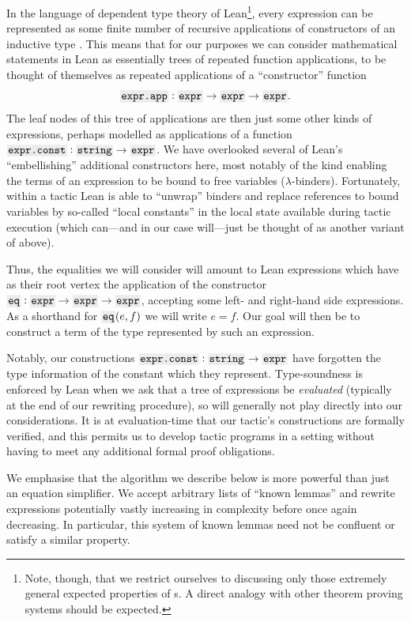 \documentclass[12pt]{easychair}
\begin{document}
In the language of dependent type theory of Lean\footnote{Note, though, that we restrict ourselves to discussing only those extremely general expected properties of \expr{}s. A direct analogy with other theorem proving systems should be expected.}, every expression can be represented as some finite number of recursive applications of constructors of an inductive type \expr{}. This means that for our purposes we can consider mathematical statements in Lean as essentially trees of repeated function applications, to be thought of themselves as repeated applications of a ``constructor'' function
\begin{equation*}
  \xx{expr.app} : \expr{} \to \expr{} \to \expr{}.
\end{equation*}
The leaf nodes of this tree of applications are then just some other kinds of expressions, perhaps modelled as applications of a function $\xx{expr.const} : \xx{string} \to \expr{}$. We have overlooked several of Lean's ``embellishing'' additional  constructors here, most notably of the kind enabling the terms of an expression to be bound to free variables ($\lambda$-binders). Fortunately, within a tactic Lean is able to ``unwrap'' binders and replace references to bound variables by so-called ``local constants'' in the local state available during tactic execution (which can---and in our case will---just be thought of as another variant of  above).

Thus, the equalities we will consider will amount to Lean expressions which have as their root vertex the application of the constructor $\xx{eq} : \expr{} \to \expr{} \to \expr{}$, accepting some left- and right-hand side expressions. As a shorthand for $\xx{eq}(e, f)$ we will write $e = f$. Our goal will then be to construct a term of the type represented by such an expression.

Notably, our constructions $\xx{expr.const} : \xx{string} \to \expr{}$ have forgotten the type information of the constant which they represent. Type-soundness is enforced by Lean when we ask that a tree of expressions be \textit{evaluated} (typically at the end of our rewriting procedure), so will generally not play directly into our considerations. It is at evaluation-time that our tactic's constructions are formally verified, and this permits us to develop tactic programs in a setting without having to meet any additional formal proof obligations.

We emphasise that the algorithm we describe below is more powerful than just an equation simplifier. We accept arbitrary lists of ``known lemmas'' and rewrite expressions potentially vastly increasing in complexity before once again decreasing. In particular, this system of known lemmas need not be confluent or satisfy a similar property.
\end{document}
